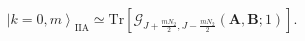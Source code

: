 \begin{equation}
\left| k=0, m \right>_{\mathrm{IIA}}
 \simeq \mathrm{Tr} \left[ 
             \mathcal{G}_{J+\frac{m N_2}{2},J-\frac{m N_2}{2}} 
                \left( \mathbf{A}, \mathbf{B}; 1 \right) 
                    \right].
\end{equation}

